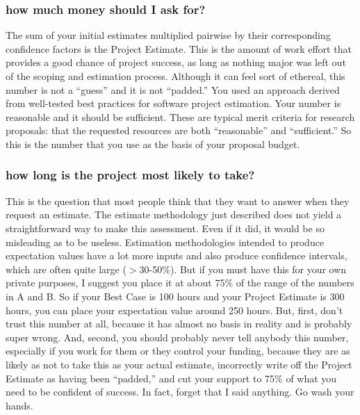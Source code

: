 \documentclass[12pt,oneside]{book}
\begin{document}
\subsubsection*{how much money should I ask for?}
\label{scrivauto:40}

The sum of your initial estimates multiplied pairwise by their corresponding confidence factors is the Project Estimate. This is the amount of work effort that provides a good chance of project success, as long as nothing major was left out of the scoping and estimation process. Although it can feel sort of ethereal, this number is not a ``guess'' and it is not ``padded.'' You used an approach derived from well-tested best practices for software project estimation. Your number is reasonable and it should be sufficient. These are typical merit criteria for research proposals: that the requested resources are both ``reasonable'' and ``sufficient.'' So this is the number that you use as the basis of your proposal budget.

\subsubsection*{how long is the project most likely to take?}
\label{scrivauto:41}

This is the question that most people think that they want to answer when they request an estimate. The estimate methodology just described does not yield a straightforward way to make this assessment. Even if it did, it would be so misleading as to be useless. Estimation methodologies intended to produce expectation values have a lot more inputs and also produce confidence intervals, which are often quite large ($>$30-50\%). But if you must have this for your own private purposes, I suggest you place it at about 75\% of the range of the numbers in A and B. So if your Best Case is 100 hours and your Project Estimate is 300 hours, you can place your expectation value around 250 hours. But, first, don't trust this number at all, because it has almost no basis in reality and is probably super wrong. And, second, you should probably never tell anybody this number, especially if you work for them or they control your funding, because they are as likely as not to take this as your actual estimate, incorrectly write off the Project Estimate as having been ``padded,'' and cut your support to 75\% of what you need to be confident of success. In fact, forget that I said anything. Go wash your hands.
\end{document}
